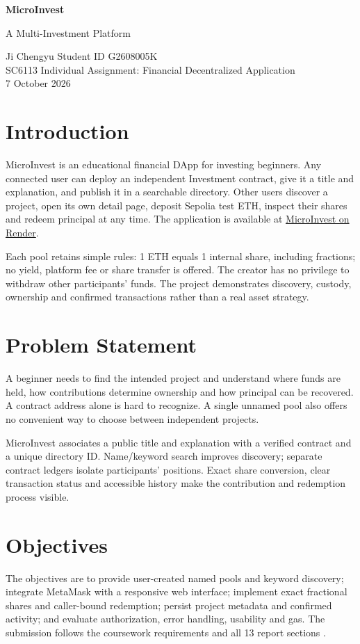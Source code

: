 \documentclass[10pt,a4paper]{article}
\begin{document}
\begin{center}
{\Large\bfseries MicroInvest\par}
{\large A Multi-Investment Platform\par}
\vspace{3pt}
Ji Chengyu \quad Student ID G2608005K\\
SC6113 Individual Assignment: Financial Decentralized Application\\
7 October 2026
\end{center}

\section{Introduction}
MicroInvest is an educational financial DApp for investing beginners. Any connected user can deploy an independent Investment contract, give it a title and explanation, and publish it in a searchable directory. Other users discover a project, open its own detail page, deposit Sepolia test ETH, inspect their shares and redeem principal at any time. The application is available at \href{https://sc6113-developemnt-coursework.onrender.com/}{MicroInvest on Render}.

Each pool retains simple rules: 1 ETH equals 1 internal share, including fractions; no yield, platform fee or share transfer is offered. The creator has no privilege to withdraw other participants' funds. The project demonstrates discovery, custody, ownership and confirmed transactions rather than a real asset strategy.

\section{Problem Statement}
A beginner needs to find the intended project and understand where funds are held, how contributions determine ownership and how principal can be recovered. A contract address alone is hard to recognize. A single unnamed pool also offers no convenient way to choose between independent projects.

MicroInvest associates a public title and explanation with a verified contract and a unique directory ID. Name/keyword search improves discovery; separate contract ledgers isolate participants' positions. Exact share conversion, clear transaction status and accessible history make the contribution and redemption process visible.

\section{Objectives}
The objectives are to provide user-created named pools and keyword discovery; integrate MetaMask with a responsive web interface; implement exact fractional shares and caller-bound redemption; persist project metadata and confirmed activity; and evaluate authorization, error handling, usability and gas. The submission follows the coursework requirements and all 13 report sections \cite{assignment}.
\end{document}
